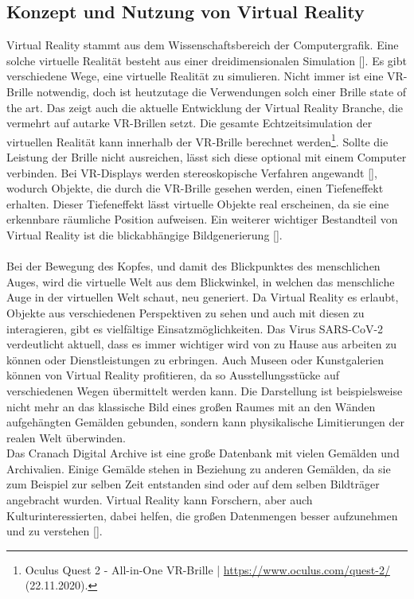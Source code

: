 \documentclass[a4paper,12pt,oneside]{article}
\begin{document}
    \subsection{Konzept und Nutzung von Virtual Reality} \label{Konzept und Nutzung von VR}
      Virtual Reality stammt aus dem Wissenschaftsbereich der Computergrafik. Eine solche
      virtuelle Realität besteht aus einer dreidimensionalen Simulation [\cite[13]{Dorner2013}].
      Es gibt verschiedene Wege, eine virtuelle Realität zu simulieren. Nicht immer ist eine 
      VR-Brille notwendig, doch ist heutzutage die Verwendungen solch einer Brille
      state of the art. Das zeigt auch die aktuelle 
      Entwicklung der Virtual Reality Branche, die vermehrt auf autarke VR-Brillen setzt.
      Die gesamte Echtzeitsimulation der virtuellen
      Realität kann innerhalb der VR-Brille berechnet werden\footnote{Oculus Quest 2 - All-in-One VR-Brille | \url{https://www.oculus.com/quest-2/} (22.11.2020).}.
      Sollte die Leistung der Brille nicht ausreichen, lässt sich diese optional mit einem
      Computer verbinden. Bei VR-Displays werden stereoskopische Verfahren angewandt [\cite[13]{Dorner2013}],
      wodurch Objekte, die durch die VR-Brille gesehen werden, einen Tiefeneffekt erhalten.
      Dieser Tiefeneffekt lässt virtuelle Objekte real erscheinen, da sie
      eine erkennbare räumliche Position aufweisen. Ein weiterer wichtiger
      Bestandteil von Virtual Reality ist die blickabhängige Bildgenerierung [\cite[13]{Dorner2013}]. \\ \\
      Bei der Bewegung des Kopfes, und damit des Blickpunktes des menschlichen Auges, wird
      die virtuelle Welt aus dem Blickwinkel, in welchen das
      menschliche Auge in der virtuellen Welt schaut, neu generiert. Da Virtual Reality 
      es erlaubt, Objekte
      aus verschiedenen Perspektiven zu sehen und auch mit diesen zu interagieren, gibt
      es vielfältige Einsatzmöglichkeiten. Das Virus SARS-CoV-2 verdeutlicht aktuell, dass es
      immer wichtiger wird von zu Hause aus arbeiten zu können oder Dienstleistungen zu
      erbringen. Auch Museen oder Kunstgalerien können von
      Virtual Reality profitieren, da so Ausstellungsstücke auf verschiedenen
      Wegen übermittelt werden kann. Die Darstellung ist beispielsweise nicht 
      mehr an das klassische Bild eines großen
      Raumes mit an den Wänden aufgehängten Gemälden gebunden, 
      sondern kann physikalische Limitierungen der
      realen Welt überwinden. \\
      Das Cranach Digital Archive ist eine große Datenbank mit
      vielen Gemälden und Archivalien. Einige Gemälde stehen in Beziehung zu anderen 
      Gemälden, da sie zum Beispiel zur selben Zeit entstanden sind oder auf dem selben
      Bildträger angebracht wurden. Virtual Reality kann Forschern, aber auch 
      Kulturinteressierten, dabei helfen, die großen Datenmengen besser aufzunehmen und
      zu verstehen [\cite[9]{Dorner2013}].
\end{document}
